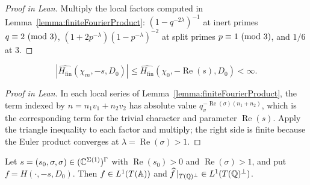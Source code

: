 \begin{proof}[Proof in Lean]

\leanok


Multiply the local factors computed in Lemma~\ref{lemma:finiteFourierProduct}: $(1-q^{-2\lambda})^{-1}$ at inert primes $q\equiv2\Mod{3}$, $(1+2p^{-\lambda})(1-p^{-\lambda})^{-2}$ at split primes $p\equiv1\Mod{3}$, and $1/6$ at $3$.

\end{proof}

\begin{equationnode}

\label{eqn:finiteEulerBound}


\leanok



\begin{equation*} \left|\widehat{H_{\mathrm{fin}}}(\chi_m,-s,D_0)\right| \leq\widehat{H_{\mathrm{fin}}}(\chi_0,{-\operatorname{Re}(s)},D_0)<\infty. \end{equation*}

\end{equationnode}

\begin{proof}[Proof in Lean]

\leanok


In each local series of Lemma~\ref{lemma:finiteFourierProduct}, the term indexed by $n=n_1v_1+n_2v_2$ has absolute value $q_v^{-\operatorname{Re}(\sigma)(n_1+n_2)}$, which is the corresponding term for the trivial character and parameter $\operatorname{Re}(s)$. Apply the triangle inequality to each factor and multiply; the right side is finite because the Euler product converges at $\lambda=\operatorname{Re}(\sigma)>1$.

\end{proof}

\begin{lemma}

\label{lemma:heightZetaConvergence}


\leanok



 Let $s=(s_0,\sigma,\sigma)\in(\CC^{\Sigma(1)})^\Gamma$ with $\operatorname{Re}(s_0)>0$ and $\operatorname{Re}(\sigma)>1$, and put $f=H(\cdot,-s,D_0)$. Then $f\in L^1(T(\AA))$ and $\widehat f\,|_{T(\QQ)^\perp}\in L^1(T(\QQ)^\perp)$. 

\end{lemma}

